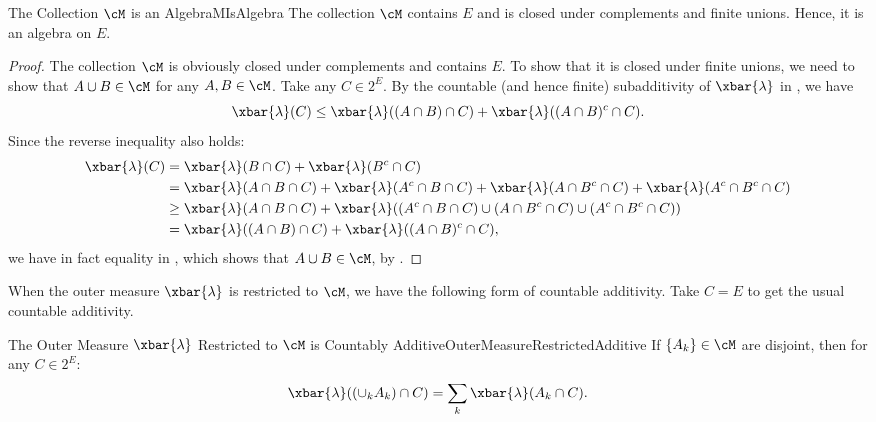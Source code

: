 \begin{lem}{The Collection $\cM$ is an Algebra}{MIsAlgebra}
	The collection $\cM$ contains $E$ and is closed under complements and finite unions. Hence, it is an algebra on $E$.
\end{lem}

\begin{proof}
	The collection $\cM$ is obviously closed under complements and contains $E$. To show that it is closed under finite unions, we need to show that $A \cup B \in \cM$ for any $A, B \in \cM$. Take any $C \in 2^E$. By the countable (and hence finite) subadditivity of $\xbar{\lambda}$ in , we have
	\begin{equation}
		\xbar{\lambda}(C) \le \xbar{\lambda}((A \cap B) \cap C) + \xbar{\lambda}((A \cap B)^c \cap C).
		\label{eq:AlgebraInequality}
	\end{equation}
	Since the reverse inequality also holds:
	\begin{align*}
		\xbar{\lambda}(C) & = \xbar{\lambda}(B \cap C) + \xbar{\lambda}(B^c \cap C)                                                                                         \\
		                  & = \xbar{\lambda}(A \cap B \cap C) + \xbar{\lambda}(A^c \cap B \cap C) + \xbar{\lambda}(A \cap B^c \cap C) + \xbar{\lambda}(A^c \cap B^c \cap C) \\
		                  & \ge \xbar{\lambda}(A \cap B \cap C) + \xbar{\lambda}((A^c \cap B \cap C) \cup (A \cap B^c \cap C) \cup (A^c \cap B^c \cap C))                   \\
		                  & = \xbar{\lambda}((A \cap B) \cap C) + \xbar{\lambda}((A \cap B)^c \cap C),
	\end{align*}
	we have in fact equality in , which shows that $A \cup B \in \cM$, by .
\end{proof}

When the outer measure $\xbar{\lambda}$ is restricted to $\cM$, we have the following form of countable additivity. Take $C=E$ to get the usual countable additivity.

\begin{lem}{The Outer Measure $\xbar{\lambda}$ Restricted to $\cM$ is Countably Additive}{OuterMeasureRestrictedAdditive}
	If $\{A_k\} \in \cM$ are disjoint, then for any $C \in 2^E$:
	\begin{equation}
		\xbar{\lambda}((\cup_k A_k) \cap C) = \sum_k \xbar{\lambda}(A_k \cap C).
		\label{eq:RestrictedAdditivity}
	\end{equation}
\end{lem}

